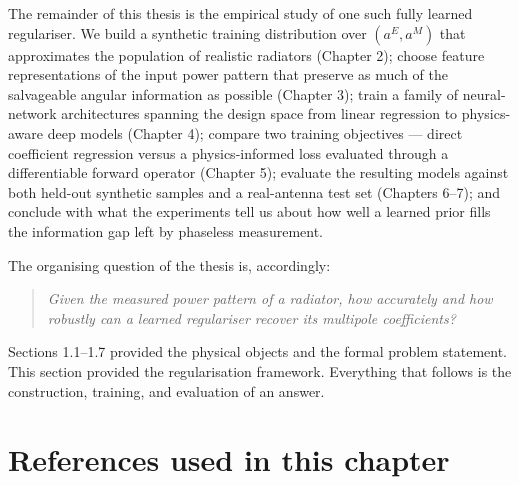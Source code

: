 \documentclass[11pt,a4paper]{report}
\begin{document}
The remainder of this thesis is the empirical study of one such fully learned
regulariser. We build a synthetic training distribution over $(a^E, a^M)$ that
approximates the population of realistic radiators (Chapter 2); choose feature
representations of the input power pattern that preserve as much of the salvageable
angular information as possible (Chapter 3); train a family of neural-network
architectures spanning the design space from linear regression to physics-aware
deep models (Chapter 4); compare two training objectives --- direct coefficient
regression versus a physics-informed loss evaluated through a differentiable
forward operator (Chapter 5); evaluate the resulting models against both held-out
synthetic samples and a real-antenna test set (Chapters 6--7); and conclude with
what the experiments tell us about how well a learned prior fills the information
gap left by phaseless measurement.

The organising question of the thesis is, accordingly:
\begin{quote}
\emph{Given the measured power pattern of a radiator, how accurately and how
robustly can a learned regulariser recover its multipole coefficients?}
\end{quote}

Sections 1.1--1.7 provided the physical objects and the formal problem statement.
This section provided the regularisation framework. Everything that follows is the
construction, training, and evaluation of an answer.
\section*{References used in this chapter}
\end{document}
